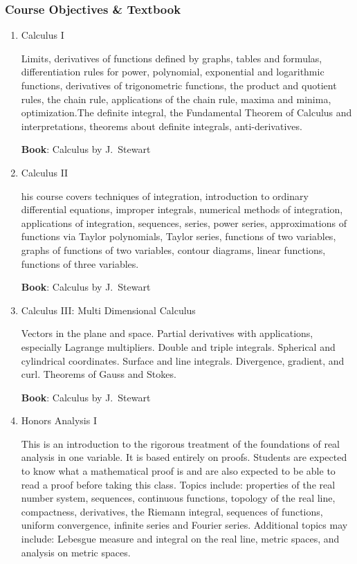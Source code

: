 \documentclass[11pt]{article}
\begin{document}
\subsubsection*{Course Objectives \& Textbook}
\begin{enumerate}
    \item Calculus I
    
    Limits, derivatives of functions defined by graphs, tables and formulas, differentiation rules for power, polynomial, exponential and logarithmic functions, derivatives of trigonometric functions, the product and quotient rules, the chain rule, applications of the chain rule, maxima and minima, optimization.The definite integral, the Fundamental Theorem of Calculus and interpretations, theorems about definite integrals, anti-derivatives.
    
    \textbf{Book}: Calculus by J.\ Stewart
    
    \item Calculus II
    
    his course covers techniques of integration, introduction to ordinary differential equations, improper integrals, numerical methods of integration, applications of integration, sequences, series, power series, approximations of functions via Taylor polynomials, Taylor series, functions of two variables, graphs of functions of two variables, contour diagrams, linear functions, functions of three variables.
    
    \textbf{Book}: Calculus by J.\ Stewart
    
    \item Calculus III: Multi Dimensional Calculus
    
    Vectors in the plane and space. Partial derivatives with applications, especially Lagrange multipliers. Double and triple integrals. Spherical and cylindrical coordinates. Surface and line integrals. Divergence, gradient, and curl. Theorems of Gauss and Stokes.
    
    \textbf{Book}: Calculus by J.\ Stewart
    
    \item Honors Analysis I
    
    This is an introduction to the rigorous treatment of the foundations of real analysis in one variable. It is based entirely on proofs. Students are expected to know what a mathematical proof is and are also expected to be able to read a proof before taking this class. Topics include: properties of the real number system, sequences, continuous functions, topology of the real line, compactness, derivatives, the Riemann integral, sequences of functions, uniform convergence, infinite series and Fourier series. Additional topics may include: Lebesgue measure and integral on the real line, metric spaces, and analysis on metric spaces.
    

\end{enumerate}
\end{document}
